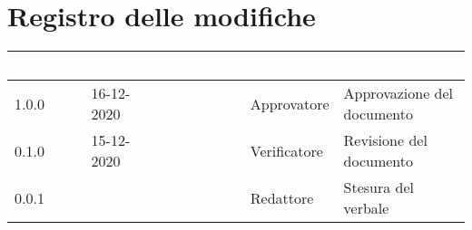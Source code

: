 \section*{Registro delle modifiche}
{
\setcounter{table}{-1}
{
\renewcommand{\arraystretch}{1.5}
\centering
\begin{longtable}{C{1.7cm} C{2.5cm} C{3.2cm} C{2.7cm} C{4.8cm}}
\textcolor{white}{\textbf{Versione}}&
\textcolor{white}{\textbf{Data}}&
\textcolor{white}{\textbf{Nominativo}}&
\textcolor{white}{\textbf{Ruolo}}&
\textcolor{white}{\textbf{Descrizione}}\\	
\endhead
		
1.0.0 & 16-12-2020 & \Approvatore{} & Approvatore & Approvazione del documento\\

0.1.0 & 15-12-2020 & \Verificatori{} & Verificatore & Revisione del documento\\

0.0.1 & \Data{} & \Redattori{} & Redattore & Stesura del verbale\\
		
\end{longtable}
}
}

